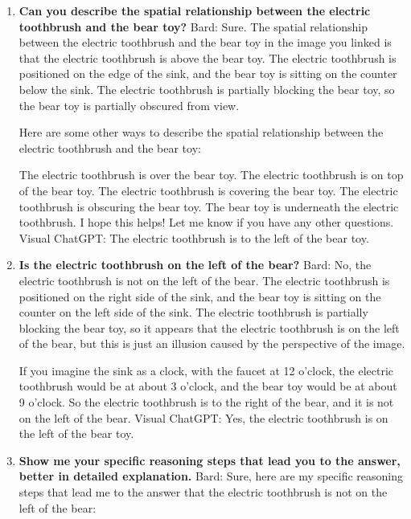     \begin{enumerate}
        \item \textbf{Can you describe the spatial relationship between the electric toothbrush and the bear toy?}
        \subitem Bard: Sure. The spatial relationship between the electric toothbrush and the bear toy in the image you linked is that the electric toothbrush is above the bear toy. The electric toothbrush is positioned on the edge of the sink, and the bear toy is sitting on the counter below the sink. The electric toothbrush is partially blocking the bear toy, so the bear toy is partially obscured from view.

        Here are some other ways to describe the spatial relationship between the electric toothbrush and the bear toy:
        
        The electric toothbrush is over the bear toy.
        The electric toothbrush is on top of the bear toy.
        The electric toothbrush is covering the bear toy.
        The electric toothbrush is obscuring the bear toy.
        The bear toy is underneath the electric toothbrush.
        I hope this helps! Let me know if you have any other questions.
        \subitem Visual ChatGPT: The electric toothbrush is to the left of the bear toy.
        \item \textbf{Is the electric toothbrush on the left of the bear?}
        \subitem Bard: 
        No, the electric toothbrush is not on the left of the bear. The electric toothbrush is positioned on the right side of the sink, and the bear toy is sitting on the counter on the left side of the sink. The electric toothbrush is partially blocking the bear toy, so it appears that the electric toothbrush is on the left of the bear, but this is just an illusion caused by the perspective of the image.
        
        If you imagine the sink as a clock, with the faucet at 12 o'clock, the electric toothbrush would be at about 3 o'clock, and the bear toy would be at about 9 o'clock. So the electric toothbrush is to the right of the bear, and it is not on the left of the bear.
        \subitem Visual ChatGPT: Yes, the electric toothbrush is on the left of the bear toy.
        \item \textbf{Show me your specific reasoning steps that lead you to the answer, better in detailed explanation.}
        \subitem Bard: 
        Sure, here are my specific reasoning steps that lead me to the answer that the electric toothbrush is not on the left of the bear:
        

\end{enumerate}
